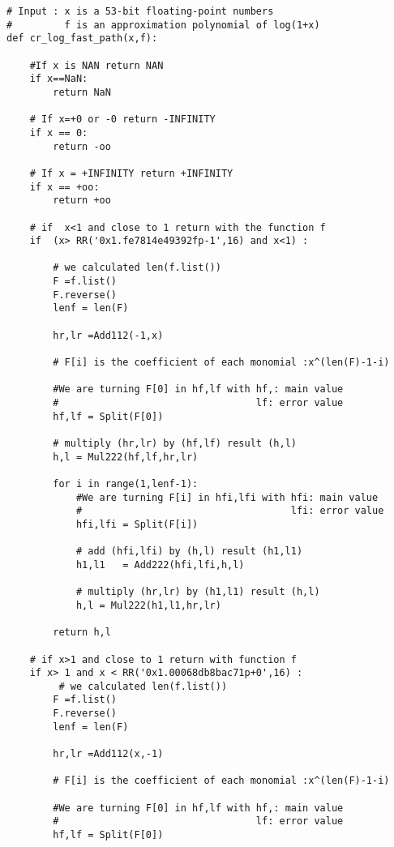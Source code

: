 \begin{lstlisting}
# Input : x is a 53-bit floating-point numbers 
#         f is an approximation polynomial of log(1+x)
def cr_log_fast_path(x,f):

    #If x is NAN return NAN
    if x==NaN:
        return NaN
    
    # If x=+0 or -0 return -INFINITY
    if x == 0:
        return -oo
    
    # If x = +INFINITY return +INFINITY
    if x == +oo:
        return +oo
    
    # if  x<1 and close to 1 return with the function f 
    if  (x> RR('0x1.fe7814e49392fp-1',16) and x<1) : 
       
        # we calculated len(f.list())
        F =f.list()
        F.reverse()
        lenf = len(F)
        
        hr,lr =Add112(-1,x)
        
        # F[i] is the coefficient of each monomial :x^(len(F)-1-i)
    
        #We are turning F[0] in hf,lf with hf,: main value
        #                                  lf: error value
        hf,lf = Split(F[0])

        # multiply (hr,lr) by (hf,lf) result (h,l)
        h,l = Mul222(hf,lf,hr,lr)
        
        for i in range(1,lenf-1):
            #We are turning F[i] in hfi,lfi with hfi: main value
            #                                    lfi: error value
            hfi,lfi = Split(F[i])

            # add (hfi,lfi) by (h,l) result (h1,l1)
            h1,l1   = Add222(hfi,lfi,h,l)

            # multiply (hr,lr) by (h1,l1) result (h,l)
            h,l = Mul222(h1,l1,hr,lr)
            
        return h,l
    
    # if x>1 and close to 1 return with function f
    if x> 1 and x < RR('0x1.00068db8bac71p+0',16) :
         # we calculated len(f.list())
        F =f.list()
        F.reverse()
        lenf = len(F)
        
        hr,lr =Add112(x,-1)
        
        # F[i] is the coefficient of each monomial :x^(len(F)-1-i)
    
        #We are turning F[0] in hf,lf with hf,: main value
        #                                  lf: error value
        hf,lf = Split(F[0])


\end{lstlisting}
